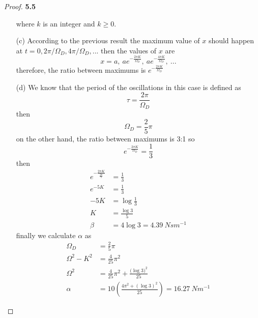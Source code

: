 \documentclass[11pt]{article}
\theoremstyle{definition}
\begin{document}
\begin{proof}{\textbf{5.5}}
\begin{itemize}
        where $k$ is an integer and $k \geq 0$.
        \item [(c)] According to the previous result the maximum value of $x$
        should happen at $t = 0, 2\pi/\Omega_D, 4\pi/\Omega_D, ...$ then the
        values of $x$ are
        $$x = a,~ae^{-\frac{2\pi K}{\Omega_D}},~ae^{-\frac{4\pi K}{\Omega_D}},~...$$
        therefore, the ratio between maximums is $e^{-\frac{2\pi K}{\Omega_D}}$
        \item [(d)] We know that the period of the oscillations in this case is
        defined as
        $$\tau = \frac{2\pi}{\Omega_D}$$
        then
        $$\Omega_D = \frac{2}{5}\pi$$
        on the other hand, the ratio between maximums is 3:1 so
        $$e^{-\frac{2\pi K}{\Omega_D}} = \frac{1}{3}$$
        then
        \begin{align*}
            e^{-\frac{2\pi K}{\frac{2\pi}{5}}} &= \frac{1}{3} \\
            e^{-5K} &= \frac{1}{3} \\
            -5K &= \log{\frac{1}{3}} \\
            K &= \frac{\log{3}}{5} \\
            \beta &= 4\log{3} = 4.39~\si{Nsm^{-1}} 
        \end{align*}
        finally we calculate $\alpha$ as
        \begin{align*}
            \Omega_D &= \frac{2}{5}\pi \\
            \Omega^2-K^2 &= \frac{4}{25}\pi^2 \\
            \Omega^2 &= \frac{4}{25}\pi^2 +\frac{(\log{3)^2}}{25} \\
            \alpha &= 10\left(\frac{4\pi^2 +(\log{3})^2}{25}\right) = 16.27~\si{Nm^{-1}} 
        \end{align*}
    \end{itemize}
    \end{proof}
\end{document}
